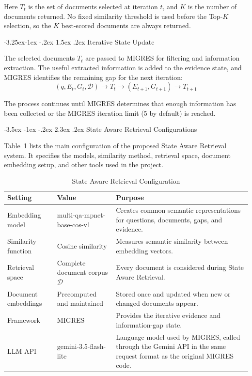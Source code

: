 \documentclass[12pt,a4paper]{report}
\makeatletter
\renewcommand\section{\@startsection{section}{1}{\z@}%
    {-3.5ex \@plus -1ex \@minus -.2ex}%
    {2.3ex \@plus.2ex}%
    {\normalfont\fontsize{16}{19}\selectfont\bfseries}}
\renewcommand\subsection{\@startsection{subsection}{2}{\z@}%
    {-3.25ex\@plus -1ex \@minus -.2ex}%
    {1.5ex \@plus .2ex}%
    {\normalfont\fontsize{14}{17}\selectfont\bfseries}}
\makeatother
\begin{document}
Here $T_t$ is the set of documents selected at iteration $t$, and $K$ is the number of documents returned. No fixed similarity threshold is used before the Top-$K$ selection, so the $K$ best-scored documents are always returned.

\subsection{Iterative State Update}

The selected documents $T_t$ are passed to MIGRES for filtering and information extraction. The useful extracted information is added to the evidence state, and MIGRES identifies the remaining gap for the next iteration:
\[
\boxed{
(q,E_t,G_t,\mathcal{D})
\rightarrow
T_t
\rightarrow
(E_{t+1},G_{t+1})
\rightarrow
T_{t+1}
}
\tag{10}
\]

The process continues until MIGRES determines that enough information has been collected or the MIGRES iteration limit (5 by default) is reached.
\clearpage

\section{State Aware Retrieval Configurations}

Table~\ref{tab:sar-settings} lists the main configuration of the proposed State Aware Retrieval system. It specifies the models, similarity method, retrieval space, document embedding setup, and other tools used in the project.

\begin{table}[H]
\centering
\caption{State Aware Retrieval Configuration}
\label{tab:sar-settings}
\renewcommand{\arraystretch}{1.2}
\begin{tabular}{|p{1.75in}|p{1.35in}|p{3.0in}|}
\hline
\textbf{Setting} & \textbf{Value} & \textbf{Purpose} \\ \hline
Embedding model & multi-qa-mpnet-\allowbreak base-cos-v1 & Creates common semantic representations for questions, documents, gaps, and evidence. \\ \hline
Similarity function & Cosine similarity & Measures semantic similarity between embedding vectors. \\ \hline
Retrieval space & Complete document corpus $\mathcal{D}$ & Every document is considered during State Aware Retrieval. \\ \hline
Document embeddings & Precomputed and maintained & Stored once and updated when new or changed documents appear. \\ \hline
Framework & MIGRES & Provides the iterative evidence and information-gap state. \\ \hline
LLM API & gemini-3.5-flash-lite & Language model used by MIGRES, called through the Gemini API in the same request format as the original MIGRES code. \\ \hline
\end{tabular}
\end{table}
\end{document}
